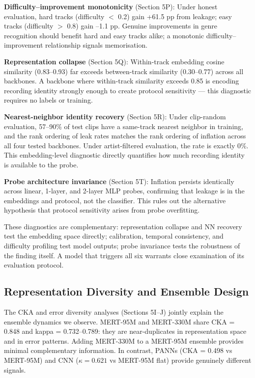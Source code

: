 \documentclass[conference]{IEEEtran}
\begin{document}
\textbf{Difficulty--improvement monotonicity} (Section 5P): Under
honest evaluation, hard tracks (difficulty \(<\) 0.2) gain +61.5 pp from
leakage; easy tracks (difficulty \(>\) 0.8) gain --1.1 pp. Genuine
improvements in genre recognition should benefit hard and easy tracks
alike; a monotonic difficulty--improvement relationship signals
memorisation.

\textbf{Representation collapse} (Section 5Q): Within-track embedding
cosine similarity (0.83--0.93) far exceeds between-track similarity
(0.30--0.77) across all backbones. A backbone where within-track
similarity exceeds 0.85 is encoding recording identity strongly enough
to create protocol sensitivity --- this diagnostic requires no
labels or training.

\textbf{Nearest-neighbor identity recovery} (Section 5R): Under
clip-random evaluation, 57--90\% of test clips have a same-track
nearest neighbor in training, and the rank ordering of leak rates
matches the rank ordering of inflation across all four tested backbones.
Under artist-filtered evaluation, the rate is exactly 0\%. This
embedding-level diagnostic directly quantifies how much recording
identity is available to the probe.

\textbf{Probe architecture invariance} (Section 5T): Inflation persists
identically across linear, 1-layer, and 2-layer MLP probes, confirming
that leakage is in the embeddings and protocol, not the classifier. This
rules out the alternative hypothesis that protocol sensitivity arises
from probe overfitting.

These diagnostics are complementary: representation collapse and NN
recovery test the embedding space directly; calibration, temporal
consistency, and difficulty profiling test model outputs; probe
invariance tests the robustness of the finding itself. A model that
triggers all six warrants close examination of its evaluation protocol.

\subsection{Representation Diversity and Ensemble
Design}\label{e.-representation-diversity-and-ensemble-design}

The CKA and error diversity analyses (Sections 5I--J) jointly explain
the ensemble dynamics we observe. MERT-95M and MERT-330M share CKA =
0.848 and kappa = 0.732--0.789: they are near-duplicates in
representation space and in error patterns. Adding MERT-330M to a
MERT-95M ensemble provides minimal complementary information. In
contrast, PANNs (CKA = 0.498 vs MERT-95M) and CNN (\(\kappa = 0.621\) vs
MERT-95M flat) provide genuinely different signals.
\end{document}

